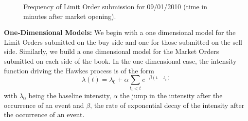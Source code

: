 	\begin{figure}[!ht]
	\centering
	\caption{Frequency of Limit Order submission for 09/01/2010 (time in minutes after market opening).\label{fig:freqsubmit2}}
	\end{figure}


\noindent\textbf{One-Dimensional Models:} We begin with a one dimensional model for the Limit Orders submitted on the buy side and one for those submitted on the sell side. Similarly, we build a one dimensional model for the Market Orders submitted on each side of the book. In the one dimensional case, the intensity function driving the Hawkes process is of the form
	\begin{equation}\label{eqn:lambda6}
	\lambda(t)= \lambda_0 + \alpha \sum_{t_i<t} e^{-\beta(t-t_i)}
	\end{equation}
with $\lambda_0$ being the baseline intensity, $\alpha$ the jump in the intensity after the occurrence of an event and $\beta$, the rate of exponential decay of the intensity after the occurrence of an event.


